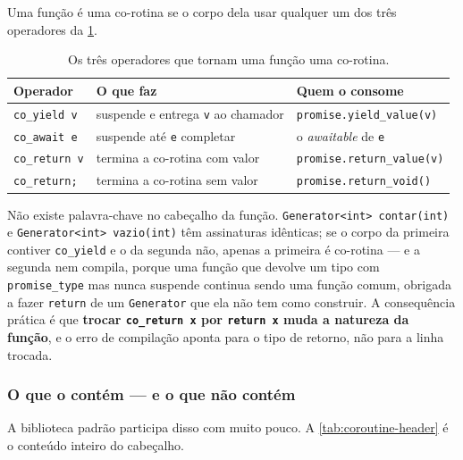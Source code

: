 Uma função é uma co-rotina se o corpo dela usar qualquer um dos três
operadores da \cref{tab:operadores-coro-lib}.

\begin{table}[htbp]
\centering
\caption{Os três operadores que tornam uma função uma co-rotina.}
\label{tab:operadores-coro-lib}
\footnotesize
\begin{tabular}{@{}lll@{}}
\toprule
\textbf{Operador} & \textbf{O que faz} & \textbf{Quem o consome} \\
\midrule
\texttt{co\_yield v}    & suspende e entrega \texttt{v} ao chamador & \texttt{promise.yield\_value(v)} \\
\texttt{co\_await e}    & suspende até \texttt{e} completar        & o \emph{awaitable} de \texttt{e} \\
\texttt{co\_return v}   & termina a co-rotina com valor            & \texttt{promise.return\_value(v)} \\
\texttt{co\_return;}    & termina a co-rotina sem valor            & \texttt{promise.return\_void()} \\
\bottomrule
\end{tabular}
\end{table}

\begin{armadilha}
Não existe palavra-chave no cabeçalho da função. \texttt{Generator<int>
contar(int)} e \texttt{Generator<int> vazio(int)} têm assinaturas idênticas; se
o corpo da primeira contiver \texttt{co\_yield} e o da segunda não, apenas a
primeira é co-rotina --- e a segunda nem compila, porque uma função que devolve
um tipo com \texttt{promise\_type} mas nunca suspende continua sendo uma função
comum, obrigada a fazer \texttt{return} de um \texttt{Generator} que ela não
tem como construir. A consequência prática é que \textbf{trocar
\texttt{co\_return x} por \texttt{return x} muda a natureza da função}, e o erro
de compilação aponta para o tipo de retorno, não para a linha trocada.
\end{armadilha}

\subsubsection{O que o  contém --- e o que não contém}

A biblioteca padrão participa disso com muito pouco. A
\cref{tab:coroutine-header} é o conteúdo inteiro do cabeçalho.

